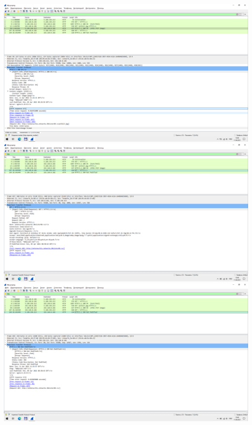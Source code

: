 \includegraphics{screenshots/http_get_jpg_response_1}
\includegraphics{screenshots/http_get_cached_request_1}
\includegraphics{screenshots/http_get_cached_response_1}
